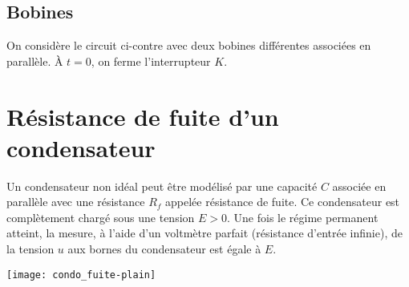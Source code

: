 \documentclass[a4paper, 12pt, final, garamond]{book}
\begin{document}
\subsection{Bobines}
\hfill
\begin{minipage}{\sujetUniquement{0.55}\siCorrige{1}\linewidth}
    On considère le circuit ci-contre avec deux bobines différentes
    associées en parallèle. À $t=0$, on ferme l'interrupteur $K$.
\end{minipage}


\resetQ
\section{Résistance de fuite d'un condensateur}

\begin{minipage}{0.5\linewidth}

    Un condensateur non idéal peut être modélisé par une capacité $C$ associée
    en parallèle avec une résistance $R_f$ appelée résistance de fuite. Ce
    condensateur est complètement chargé sous une tension $E > 0$. Une fois le
    régime permanent atteint, la mesure, à l'aide d’un voltmètre parfait
    (résistance d’entrée infinie), de la tension $u$ aux bornes du condensateur
    est égale à $E$.
\end{minipage}
\hfill
\begin{minipage}{0.45\linewidth}
    \begin{center}
        \texttt{[image: condo\_fuite-plain]}
    \end{center}
\end{minipage}
\end{document}
